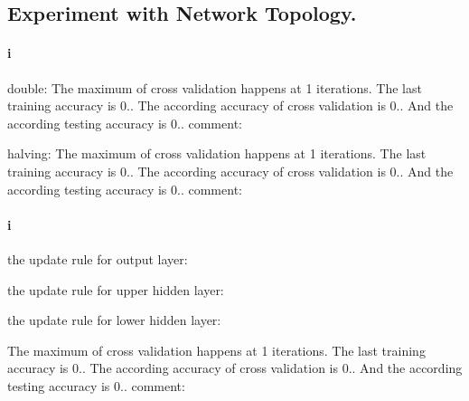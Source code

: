 \documentclass{article} %
\begin{document}
	\subsection{Experiment with Network Topology.}
	\paragraph{i}
	double:
	The maximum of cross validation happens at 1 iterations. The last training accuracy is 0.. The according accuracy of cross validation is 0.. And the according testing accuracy is 0..
	comment:

	halving:
	The maximum of cross validation happens at 1 iterations. The last training accuracy is 0.. The according accuracy of cross validation is 0.. And the according testing accuracy is 0..
	comment:
	\paragraph{i}
	the update rule for output layer:

	the update rule for upper hidden layer:

	the update rule for lower hidden layer:

	The maximum of cross validation happens at 1 iterations. The last training accuracy is 0.. The according accuracy of cross validation is 0.. And the according testing accuracy is 0..
	comment:


                                                                                                                                                     
\end{document}
